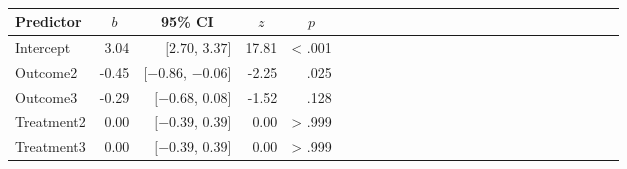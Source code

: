 \documentclass[english,man]{apa6}
\theoremstyle{definition}
\theoremstyle{definition}
\theoremstyle{definition}
\theoremstyle{remark}
\begin{document}
\begin{table}[tbp]
\begin{center}
\begin{threeparttable}
\caption{\label{tab:unnamed-chunk-9}}
\begin{tabular}{lrrrrlrrrrlrrrrlrrrrlrrrr}
\toprule
Predictor & \multicolumn{1}{c}{$b$} & \multicolumn{1}{c}{95\% CI} & \multicolumn{1}{c}{$z$} & \multicolumn{1}{c}{$p$}\\
\midrule
Intercept & 3.04 & $[2.70$, $3.37]$ & 17.81 & < .001\\
Outcome2 & -0.45 & $[-0.86$, $-0.06]$ & -2.25 & .025\\
Outcome3 & -0.29 & $[-0.68$, $0.08]$ & -1.52 & .128\\
Treatment2 & 0.00 & $[-0.39$, $0.39]$ & 0.00 & > .999\\
Treatment3 & 0.00 & $[-0.39$, $0.39]$ & 0.00 & > .999\\
\bottomrule
\end{tabular}
\end{threeparttable}
\end{center}
\end{table}
\end{document}
